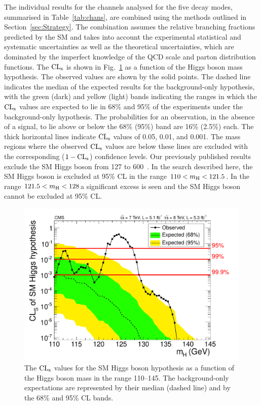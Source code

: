 \documentclass[11pt,twoside,a4paper,cmspaper,final]{cms-tdr}
\begin{document}
The individual results for the channels analysed for the five decay
modes, summarised in Table~\ref{tab:chans}, are combined using the
methods outlined in Section~\ref{sec:Strategy}.
The combination assumes the relative branching fractions predicted by the SM and takes into account the experimental statistical and
systematic uncertainties as well as the theoretical uncertainties, which are
dominated by the imperfect knowledge of the QCD scale and parton distribution functions.
The $\mathrm{CL_s}$ is shown in Fig.~\ref{fig:CLs} as a function of the Higgs boson mass hypothesis.
The observed values
are shown by the solid points.
The dashed  line indicates the median of the expected results for
the background-only hypothesis,
with the green (dark) and yellow (light) bands indicating the ranges in which
the $\mathrm{CL_s}$ values are expected to lie in 68\% and 95\%
of the experiments under the background-only hypothesis.
The probabilities for an observation, in the absence of a signal,  to lie above or below the 68\% (95\%) band are 16\% (2.5\%) each.
The thick  horizontal lines indicate $\mathrm{CL_s}$ values of  0.05, 0.01, and 0.001.
The mass regions where the observed $\mathrm{CL_s}$ values are below these lines are excluded
with the corresponding ($1-\mathrm{CL_s}$) confidence levels.
Our previously published results exclude the SM Higgs boson from 127 to 600\GeV~\cite{Chatrchyan:2012tx}.
In the search described here, the SM Higgs boson is excluded at 95\%
CL in the range $110 < m_{\mathrm{H}} < {\relax121.5}$\GeV.
In the range ${\relax121.5} < m_{\mathrm{H}} < {\relax128}$\GeV  a significant excess is seen and the SM Higgs boson
cannot be excluded at 95\% CL.

\begin{figure} [htbp]
\begin{center}
\includegraphics[width=\cmsFigWideWidth]{sqr_smacls_comb_HPA_smallGGScale}
\caption{ The $\mathrm{CL_s}$ values for the SM Higgs boson hypothesis
as a function of the Higgs boson mass in the range 110--145\GeV.
The background-only expectations are represented by their median (dashed line) and by the 68\%  and 95\% CL bands.
    }
\label{fig:CLs}
\end{center}
\end{figure}
\end{document}
